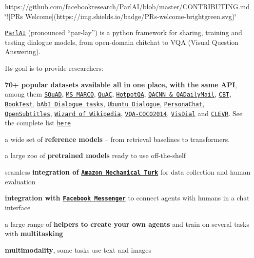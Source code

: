 

\href{https://github.com/facebookresearch/ParlAI/blob/master/LICENSE}{\tt } \href{https://circleci.com/gh/facebookresearch/ParlAI/tree/master}{\tt } https\+://github.com/facebookresearch/\+Parl\+A\+I/blob/master/\+C\+O\+N\+T\+R\+I\+B\+U\+T\+I\+N\+G.\+md \char`\"{}!\mbox{[}\+P\+Rs Welcome\mbox{]}(https\+://img.\+shields.\+io/badge/\+P\+Rs-\/welcome-\/brightgreen.\+svg)\char`\"{} \href{https://twitter.com/parlai_parley}{\tt } 



\href{http://parl.ai}{\tt Parl\+AI} (pronounced “par-\/lay”) is a python framework for sharing, training and testing dialogue models, from open-\/domain chitchat to V\+QA (Visual Question Answering).

Its goal is to provide researchers\+:


\begin{DoxyItemize}
\item {\bfseries 70+ popular datasets available all in one place, with the same A\+PI}, among them \href{https://rajpurkar.github.io/SQuAD-explorer/}{\tt S\+Qu\+AD}, \href{http://www.msmarco.org/}{\tt MS M\+A\+R\+CO}, \href{https://www.aclweb.org/anthology/D18-1241}{\tt Qu\+AC}, \href{https://hotpotqa.github.io/}{\tt Hotpot\+QA}, \href{https://arxiv.org/abs/1506.03340}{\tt Q\+A\+C\+NN \& Q\+A\+Daily\+Mail}, \href{https://arxiv.org/abs/1511.02301}{\tt C\+BT}, \href{https://arxiv.org/abs/1610.00956}{\tt Book\+Test}, \href{https://arxiv.org/abs/1605.07683}{\tt b\+AbI Dialogue tasks}, \href{https://arxiv.org/abs/1506.08909}{\tt Ubuntu Dialogue}, \href{https://arxiv.org/abs/1801.07243}{\tt Persona\+Chat}, \href{http://opus.lingfil.uu.se/OpenSubtitles.php}{\tt Open\+Subtitles}, \href{https://openreview.net/forum?id=r1l73iRqKm}{\tt Wizard of Wikipedia}, \href{http://visualqa.org/}{\tt V\+Q\+A-\/\+C\+O\+C\+O2014}, \href{https://arxiv.org/abs/1611.08669}{\tt Vis\+Dial} and \href{http://cs.stanford.edu/people/jcjohns/clevr/}{\tt C\+L\+E\+VR}. See the complete list \href{https://github.com/facebookresearch/ParlAI/blob/master/parlai/tasks/task_list.py}{\tt here}
\item a wide set of {\bfseries reference models} -- from retrieval baselines to transformers.
\item a large zoo of {\bfseries pretrained models} ready to use off-\/the-\/shelf
\item seamless {\bfseries integration of \href{https://www.mturk.com/mturk/welcome}{\tt Amazon Mechanical Turk}} for data collection and human evaluation
\item {\bfseries integration with \href{http://www.parl.ai/docs/tutorial_messenger.html}{\tt Facebook Messenger}} to connect agents with humans in a chat interface
\item a large range of {\bfseries helpers to create your own agents} and train on several tasks with {\bfseries multitasking}
\item {\bfseries multimodality}, some tasks use text and images
\end{DoxyItemize}

